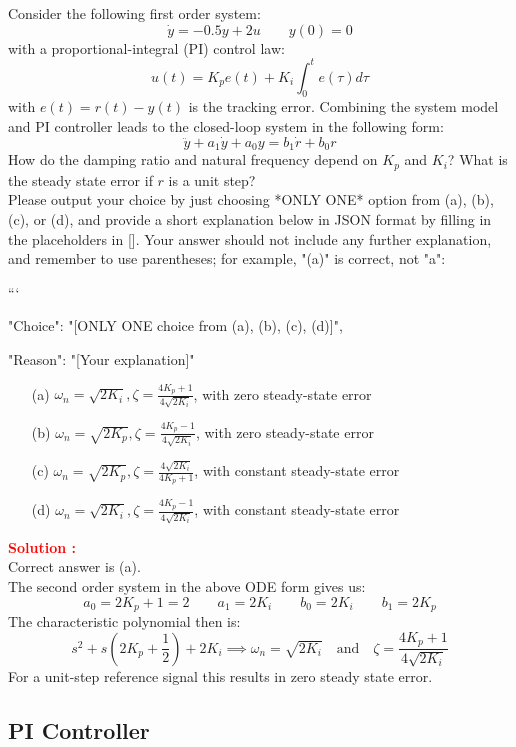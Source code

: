 \documentclass[12pt]{article}
\begin{document}
Consider the following first order system:
\[
\dot{y} = -0.5y + 2u \qquad  y(0) = 0
\]
with a proportional-integral (PI) control law: 
$$u(t)=K_p e(t)+K_i \int_0^t e(\tau) d \tau$$ with $e(t)=r(t)-y(t)$ is the tracking error. Combining the system model and PI controller leads to the closed-loop system in the following form:
\[
\ddot{y}+ a_1 \dot{y} + a_0 y = b_1 \dot{r} + b_0 r
\]
How do the damping ratio and natural frequency depend on $K_p$ and $K_i$? What is the steady state error if $r$ is a unit step? \\
 Please output your choice by just choosing *ONLY ONE* option from (a), (b), (c), or (d), and provide a short explanation below in JSON format by filling in the placeholders in []. Your answer should not include any further explanation, and remember to use parentheses; for example, "(a)" is correct, not "a":

```
{

"Choice": "[ONLY ONE choice from (a), (b), (c), (d)]",

"Reason": "[Your explanation]"

}

\begin{itemize}
    \item[(a)] \(\omega_n = \sqrt{2K_i},  \zeta = \frac{4K_p + 1}{4\sqrt{2K_i}}\), with zero steady-state error
    \item[(b)] \(\omega_n = \sqrt{2K_p},  \zeta = \frac{4K_p - 1}{4\sqrt{2K_i}}\), with zero steady-state error
    \item[(c)] \(\omega_n = \sqrt{2K_p},  \zeta = \frac{4\sqrt{2K_i}}{4K_p + 1}\), with constant steady-state error
    \item[(d)] \(\omega_n = \sqrt{2K_i},  \zeta = \frac{4K_p - 1}{4\sqrt{2K_i}}\), with constant steady-state error
\end{itemize}
\textbf{\textcolor{red}{Solution :}} \\
Correct answer is (a).\\
The second order system in the above ODE form gives us:
\[
a_0 = 2K_p + 1=2 \qquad  a_1 = 2K_i \qquad b_0 = 2K_i \qquad b_1 = 2K_p
\]
The characteristic polynomial then is:
\[
s^2 + s (2K_p + \frac{1}{2}) + 2K_i \implies \omega_n = \sqrt{2K_i} \quad \text{and} \quad \zeta = \frac{4K_p + 1}{4\sqrt{2K_i}}
\]
For a unit-step reference signal this results in zero steady state error.
\clearpage

\subsection{PI Controller}
\end{document}
